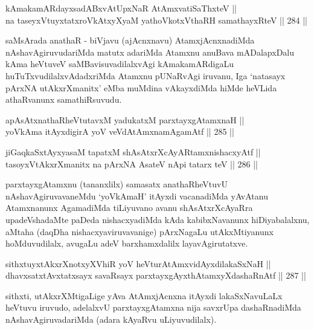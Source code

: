 \begin{shl}
kAmakamARdayxsadABxvAtUpxNaR AtAmx\s vatiSaThxteV ||  \\
na taseyxVtuyxtatxroVkAtxyX\s yaM yathoVkotxV\s thaRH samathayxRteV \hfill || 284 ||  
\end{shl}

\begin{artha}
saMsArada anathaR - biVjavu (ajAcnxnavu) AtamxjAcnxnadiMda
nAshavAgiruvudariMda matutx adariMda Atamxnu anuBava mADalapxDalu kAma
heVtuveV saMBavisuvadilalxvAgi kAmakamARdigaLu huTuTxvudilalxvAdadxriMda
Atamxnu pUNaRvAgi iruvanu, Iga `natasayx pArxNA utAkxrXmanitx' eMba
muMdina vAkayxdiMda hiMde heVLida athaRvanunx samathiRsuvudu.
\end{artha}

\begin{shl}
apAsAtxnathaRheVtutavxM yadukatxM parxtayxgAtamxnaH || \\
yoV\s kAma itAyxdigirA yoV veVdA\s \s tAmxnamAgamAtf \hfill || 285 ||  
\end{shl}

\begin{shl}
jiGaqkaSxtAyxyasaM tapatxM shAsAtxrXcAyARtamxnishacxyAtf ||  \\
tasoyxVtAkxrXmanitx na pArxNA AsateV nApi tatarx teV \hfill || 286 ||  
\end{shl}

\begin{artha}
parxtayxgAtamxnu (tananxlilx) samasatx anathaRheVtuvU
nAshavAgiruvavaneMdu `yoV\s kAmaH' itAyxdi vacanadiMda yAvAtanu
Atamxnanunx AgamadiMda tiLiyuvano avanu shAsAtxrXcAyaRra
upadeVshadaMte paDeda nishacxyadiMda kAda kabibxNavanunx
hiDiyabalalxnu, aMtaha (daqDha nishacxyaviruvavanige) pArxNagaLu
utAkxMtiyanunx hoMduvudilalx, avugaLu adeV barxhamxdalilx
layavAgirutatxve.
\end{artha}


\begin{shl}
sithxtuyxtAkxrXnotxyXVhiR yoV heVturAtAmxvidAyxdilakaSxNaH || \\
dhavxsatxtAvxtatxsayx savaRsayx parxtayxgAyxthAtamxyXdashaRnAtf \hfill || 287 ||  
\end{shl}

\begin{artha}
sithxti, utAkxrXMtigaLige yAva AtAmxjAcnxna itAyxdi lakaSxNavuLaLx
heVtuvu iruvudo, adelalxvU parxtayxgAtamxna nija savxrUpa
dashaRnadiMda nAshavAgiruvadariMda (adara kAyaRvu uLiyuvudilalx).
\end{artha}

